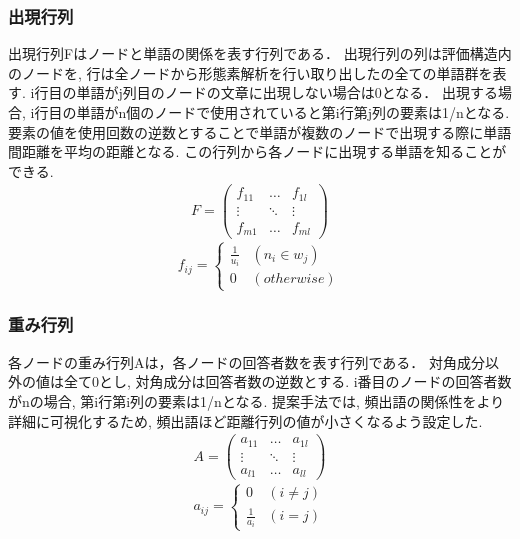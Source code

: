 \documentclass[syuuron]{kuee}
\begin{document}
			\subsubsection{出現行列}
				出現行列Fはノードと単語の関係を表す行列である．
				出現行列の列は評価構造内のノードを, 行は全ノードから形態素解析を行い取り出したの全ての単語群を表す. 
				i行目の単語がj列目のノードの文章に出現しない場合は0となる．
				出現する場合, i行目の単語がn個のノードで使用されていると第i行第j列の要素は1/nとなる. 
				要素の値を使用回数の逆数とすることで単語が複数のノードで出現する際に単語間距離を平均の距離となる. 
				この行列から各ノードに出現する単語を知ることができる. 
				\begin{eqnarray}
				 F = \left(
				    \begin{array}{cccc}
				    	f_{11} & \ldots & f_{1l} \\
				    	\vdots & \ddots & \vdots \\
				    	f_{m1} & \ldots & f_{ml}
					\end{array}
				 \right)
				\end{eqnarray}	
				\[
				  f_{ij} = \left\{ \begin{array}{ll}
				    \frac{1}{u_i} & (n_i \in w_j) \\
				    0 & (otherwise)
				  \end{array} \right.
				\]
				
			\subsubsection{重み行列}
				各ノードの重み行列Aは，各ノードの回答者数を表す行列である．
				対角成分以外の値は全て0とし, 対角成分は回答者数の逆数とする. 
				i番目のノードの回答者数がnの場合, 第i行第i列の要素は1/nとなる. 
				提案手法では, 頻出語の関係性をより詳細に可視化するため, 頻出語ほど距離行列の値が小さくなるよう設定した. 
				\begin{eqnarray}
				 A = \left(
				    \begin{array}{cccc}
				    	a_{11} & \ldots & a_{1l} \\
				    	\vdots & \ddots & \vdots \\
				    	a_{l1} & \ldots & a_{ll}
					\end{array}
				 \right)
				\end{eqnarray}
				\[
				  a_{ij} = \left\{ \begin{array}{ll}
				     0 & (i ≠ j) \\
				     \frac{1}{a_i} & (i = j)
				  \end{array} \right.
				\]
				
\end{document}
